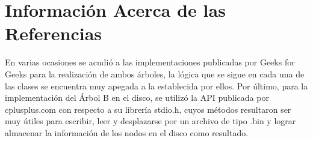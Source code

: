 \documentclass[acmsmall]{acmart}
\begin{document}
\section{Información Acerca de las Referencias}
En varias ocasiones se acudió a las implementaciones publicadas por Geeks for Geeks para la realización de ambos árboles, la lógica que se sigue en cada una de las clases se encuentra muy apegada a la establecida por ellos. Por último, para la implementación del Árbol B en el disco, se utilizó la API publicada por cplusplus.com con respecto a su librería stdio.h, cuyos métodos resultaron ser muy útiles para escribir, leer y desplazarse por un archivo de tipo .bin y lograr almacenar la información de los nodos en el disco como resultado.
\end{document}
